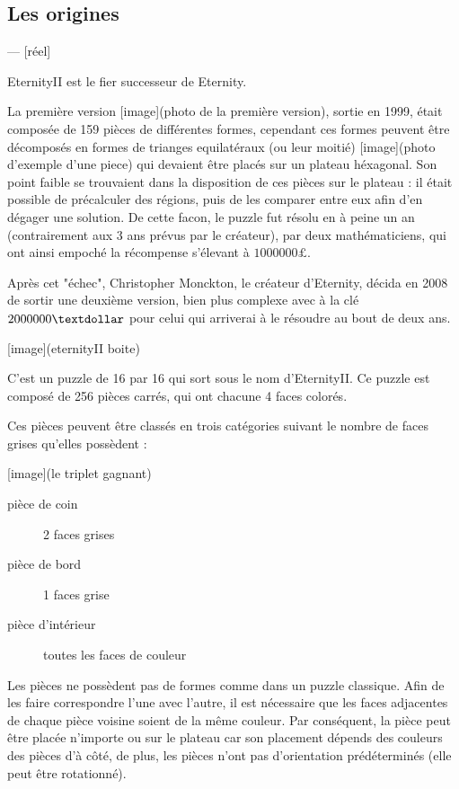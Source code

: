 \documentclass{article}
\begin{document}
	\subsection{Les origines}
	--- [réel]
	
	EternityII est le fier successeur de Eternity.
	
	La première version [image](photo de la première version), sortie en 1999, était composée de 159 pièces de différentes formes, cependant ces formes peuvent être décomposés en formes de trianges equilatéraux (ou leur moitié) [image](photo d'exemple d'une piece) qui devaient être placés sur un plateau héxagonal. Son point faible se trouvaient dans la disposition de ces pièces sur le plateau : il était possible de précalculer des régions, puis de les comparer entre eux afin d'en dégager une solution.
	De cette facon, le puzzle fut résolu en à peine un an (contrairement aux 3 ans prévus par le créateur), par deux mathématiciens, qui ont ainsi empoché la récompense s'élevant à $1000000\pounds$.
	
	Après cet "échec", Christopher Monckton, le créateur d'Eternity, décida en 2008 de sortir une deuxième version, bien plus complexe avec à la clé $2000000\textdollar$ pour celui qui arriverai à le résoudre au bout de deux ans.
	
	[image](eternityII boite)
	
	C'est un puzzle de 16 par 16 qui sort sous le nom d'EternityII. Ce puzzle est composé de 256 pièces carrés, qui ont chacune 4 faces colorés.
	
	Ces pièces peuvent être classés en trois catégories suivant le nombre de faces grises qu'elles possèdent :
	
	[image](le triplet gagnant)
	
	\begin{description}
		\item [pièce de coin] 2 faces grises
		\item [pièce de bord] 1 faces grise
		\item [pièce d'intérieur] toutes les faces de couleur
	\end{description}
	
	Les pièces ne possèdent pas de formes comme dans un puzzle classique. Afin de les faire correspondre l'une avec l'autre, il est nécessaire que les faces adjacentes de chaque pièce voisine soient de la même couleur. Par conséquent, la pièce peut être placée n'importe ou sur le plateau car son placement dépends des couleurs des pièces d'à côté, de plus, les pièces n'ont pas d'orientation prédéterminés (elle peut être rotationné).
	
\end{document}
